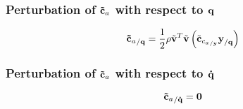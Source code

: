\subsubsection{Perturbation of $\bm{\mathbf{\tilde{c}}}_a$ with respect to $\bm{\mathbf{q}}$}
\begin{equation}
{\bm{\mathbf{\tilde{c}}}_a}_{/\bm{\mathbf{q}}} = 
	\frac{1}{2} \rho \tilde{\bm{\mathbf{v}}}^T \tilde{\bm{\mathbf{v}}} 
	\left(  \tilde{\bm{\mathbf{c}}}_{{c_{a}}_{/\bm{\mathbf{y}}}} \bm{\mathbf{y}}_{/\bm{\mathbf{q}}}  \right) 
\end{equation}
\subsubsection{Perturbation of $\bm{\mathbf{\tilde{c}}}_a$ with respect to $\bm{\mathbf{\dot{q}}}$}
\begin{equation}
{\bm{\mathbf{\tilde{c}}}_a}_{/\bm{\mathbf{\dot{q}}}} = \bm{\mathbf{0}}
\end{equation}

